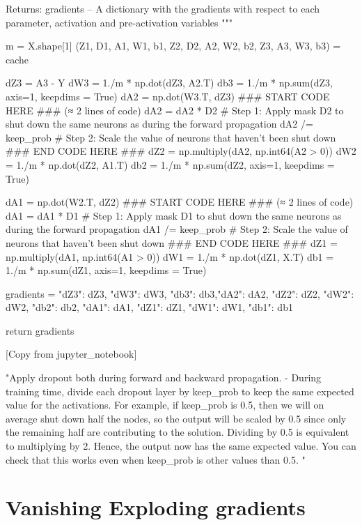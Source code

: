 \documentclass[11pt, onecolumn]{article}
\begin{document}
    Returns:
    gradients -- A dictionary with the gradients with respect to each parameter, activation and pre-activation variables
    """
    
    m = X.shape[1]
    (Z1, D1, A1, W1, b1, Z2, D2, A2, W2, b2, Z3, A3, W3, b3) = cache
    
    dZ3 = A3 - Y
    dW3 = 1./m * np.dot(dZ3, A2.T)
    db3 = 1./m * np.sum(dZ3, axis=1, keepdims = True)
    dA2 = np.dot(W3.T, dZ3)
    ### START CODE HERE ### (≈ 2 lines of code)
    dA2 = dA2 * D2            # Step 1: Apply mask D2 to shut down the same neurons as during the forward propagation
    dA2 /= keep_prob          # Step 2: Scale the value of neurons that haven't been shut down
    ### END CODE HERE ###
    dZ2 = np.multiply(dA2, np.int64(A2 > 0))
    dW2 = 1./m * np.dot(dZ2, A1.T)
    db2 = 1./m * np.sum(dZ2, axis=1, keepdims = True)
    
    dA1 = np.dot(W2.T, dZ2)
    ### START CODE HERE ### (≈ 2 lines of code)
    dA1 = dA1 * D1              # Step 1: Apply mask D1 to shut down the same neurons as during the forward propagation
    dA1 /= keep_prob             # Step 2: Scale the value of neurons that haven't been shut down
    ### END CODE HERE ###
    dZ1 = np.multiply(dA1, np.int64(A1 > 0))
    dW1 = 1./m * np.dot(dZ1, X.T)
    db1 = 1./m * np.sum(dZ1, axis=1, keepdims = True)
    
    gradients = {"dZ3": dZ3, "dW3": dW3, "db3": db3,"dA2": dA2,
                 "dZ2": dZ2, "dW2": dW2, "db2": db2, "dA1": dA1, 
                 "dZ1": dZ1, "dW1": dW1, "db1": db1}
    
    return gradients

[Copy from jupyter_notebook]


"Apply dropout both during forward and backward propagation. - During training time, divide each dropout layer by keep_prob to keep the same expected value for the activations. For example, if keep_prob is 0.5, then we will on average shut down half the nodes, so the output will be scaled by 0.5 since only the remaining half are contributing to the solution. Dividing by 0.5 is equivalent to multiplying by 2. Hence, the output now has the same expected value. You can check that this works even when keep_prob is other values than 0.5. "





\section{Vanishing Exploding gradients}
\end{document}
